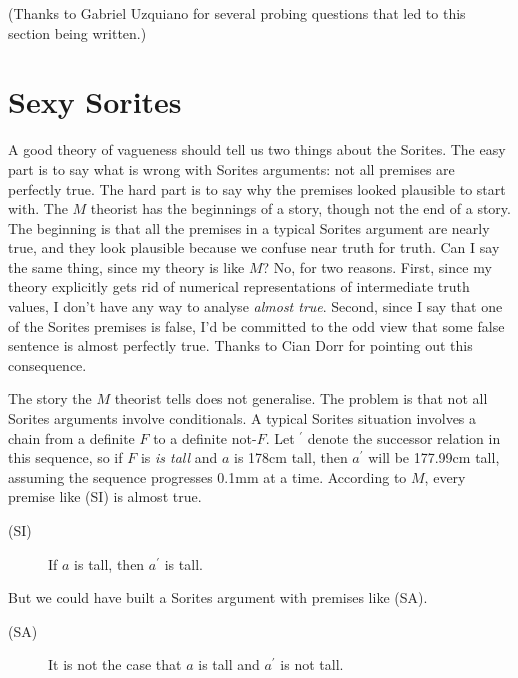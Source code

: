 \noindent (Thanks to Gabriel Uzquiano for several probing questions that led to this section being written.)

\section{Sexy Sorites }
A good theory of vagueness should tell us two things about the Sorites. The easy part is to say what is wrong with Sorites arguments: not all premises are perfectly true. The hard part is to say why the premises looked plausible to start with. The \(M\) theorist has the beginnings of a story, though not the end of a story. The beginning is that all the premises in a typical Sorites argument are nearly true, and they look plausible because we confuse near truth for truth. Can I say the same thing, since my theory is like \(M\)? No, for two reasons. First, since my theory explicitly gets rid of numerical representations of intermediate truth values, I don't have any way to analyse \textit{almost true}. Second, since I say that one of the Sorites premises is false, I'd be committed to the odd view that some false sentence is almost perfectly true. Thanks to Cian Dorr for pointing out this consequence.

The story the \(M\) theorist tells does not generalise. The problem is that not all Sorites arguments involve conditionals. A typical Sorites situation involves a chain from a definite \(F\) to a definite not-\(F\). Let \(^\prime\) denote the successor relation in this sequence, so if \(F\) is \textit{is tall} and \(a\) is 178cm tall, then \(a ^\prime\) will be 177.99cm tall, assuming the sequence progresses 0.1mm at a time. According to \(M\), every premise like (SI) is almost true.

\begin{description}
\item[(SI)] If \(a\) is tall, then \(a ^\prime\) is tall.
\end{description}

\noindent But we could have built a Sorites argument with premises like (SA).

\begin{description}
\item[(SA)] It is not the case that \(a\) is tall and \(a ^\prime\) is not tall.
\end{description}

